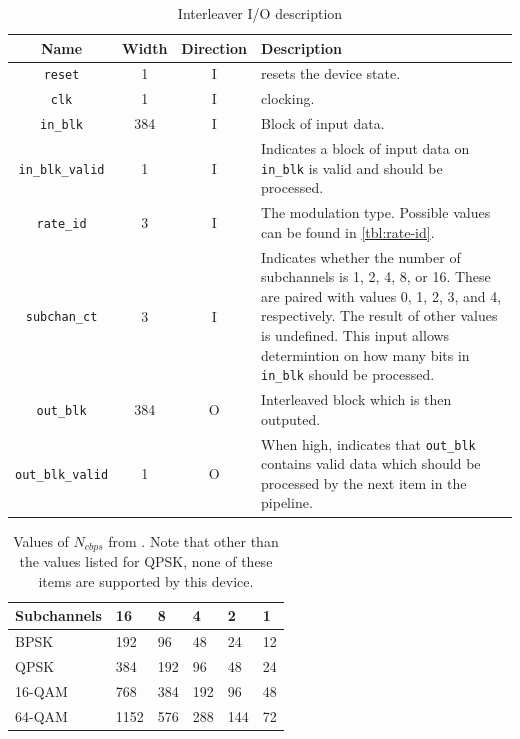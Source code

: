 \documentclass[dvips,10pt,twocolumn]{article}
\newcommand{\wire}{\texttt}
\begin{document}
\begin{table} \begin{tabularx}{\linewidth}{c|c|c|X}
	\label{tbl:interleave-io}
	Name & Width & Direction & Description \\ \hline

	\wire{reset} & 1 & I & resets the device state. \\

	\wire{clk}   & 1 & I & clocking. \\

	\wire{in\_blk} & 384 & I & Block of input data. \\

	\wire{in\_blk\_valid} & 1 & I & Indicates a block of input data on
	\wire{in\_blk} is valid and should be processed. \\

	\wire{rate\_id} & 3 & I & The modulation type. Possible values can be
	found in \autoref{tbl:rate-id}. \\

	\wire{subchan\_ct} & 3 & I & Indicates whether the number of subchannels
	is 1, 2, 4, 8, or 16. These are paired with values 0, 1, 2, 3, and 4,
	respectively. The result of other values is undefined. This input
	allows determintion on how many bits in \wire{in\_blk} should be
	processed. \\

	\wire{out\_blk} & 384 & O & Interleaved block which is then outputed.
	\\

	\wire{out\_blk\_valid} & 1 & O & When high, indicates that
	\wire{out\_blk} contains valid data which should be processed by the
	next item in the pipeline. 
\end{tabularx} \caption{Interleaver I/O description} \end{table}


\begin{table} \begin{tabularx}{\linewidth}{X|X|X|X|X|X}
	\label{tbl:Ncbps}
	Subchannels & 16 & 8 & 4 & 2 & 1 \\ \hline
	
	BPSK   & 192  & 96  & 48  & 24  & 12 \\
	QPSK   & 384  & 192 & 96  & 48  & 24 \\
	16-QAM & 768  & 384 & 192 & 96  & 48 \\
	64-QAM & 1152 & 576 & 288 & 144 & 72
\end{tabularx} \caption{Values of $N_{cbps}$ from \cite{IEEE:802.16}. Note
that other than the values listed for QPSK, none of these items are
supported by this device.} \end{table}
\end{document}

